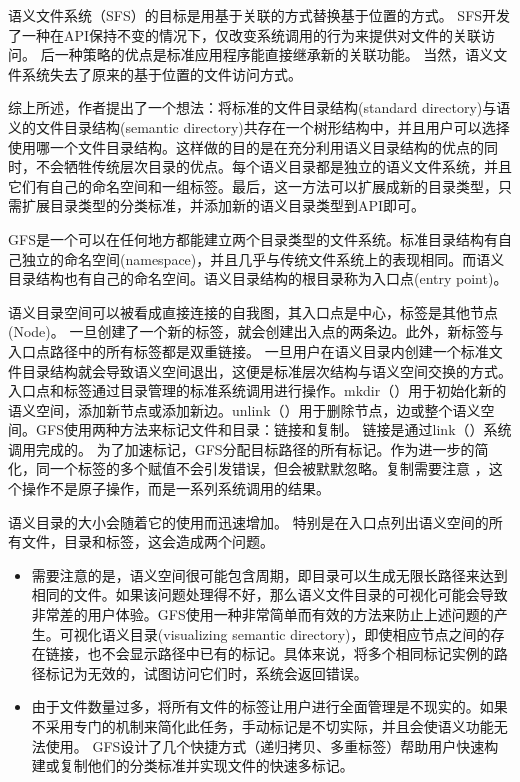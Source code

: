 \documentclass[UTF8]{ctexart}
\begin{document}
语义文件系统（SFS）的目标是用基于关联的方式替换基于位置的方式。 SFS开发了一种在API保持不变的情况下，仅改变系统调用的行为来提供对文件的关联访问。 后一种策略的优点是标准应用程序能直接继承新的关联功能。 当然，语义文件系统失去了原来的基于位置的文件访问方式。

综上所述，作者提出了一个想法：将标准的文件目录结构(standard directory)与语义的文件目录结构(semantic directory)共存在一个树形结构中，并且用户可以选择使用哪一个文件目录结构。这样做的目的是在充分利用语义目录结构的优点的同时，不会牺牲传统层次目录的优点。每个语义目录都是独立的语义文件系统，并且它们有自己的命名空间和一组标签。最后，这一方法可以扩展成新的目录类型，只需扩展目录类型的分类标准，并添加新的语义目录类型到API即可。

GFS是一个可以在任何地方都能建立两个目录类型的文件系统。标准目录结构有自己独立的命名空间(namespace)，并且几乎与传统文件系统上的表现相同。而语义目录结构也有自己的命名空间。语义目录结构的根目录称为入口点(entry point)。

语义目录空间可以被看成直接连接的自我图，其入口点是中心，标签是其他节点(Node)。 一旦创建了一个新的标签，就会创建出入点的两条边。此外，新标签与入口点路径中的所有标签都是双重链接。 一旦用户在语义目录内创建一个标准文件目录结构就会导致语义空间退出，这便是标准层次结构与语义空间交换的方式。入口点和标签通过目录管理的标准系统调用进行操作。mkdir（）用于初始化新的语义空间，添加新节点或添加新边。unlink（）用于删除节点，边或整个语义空间。GFS使用两种方法来标记文件和目录：链接和复制。 链接是通过link（）系统调用完成的。 为了加速标记，GFS分配目标路径的所有标记。作为进一步的简化，同一个标签的多个赋值不会引发错误，但会被默默忽略。复制需要注意 ，这个操作不是原子操作，而是一系列系统调用的结果。

语义目录的大小会随着它的使用而迅速增加。 特别是在入口点列出语义空间的所有文件，目录和标签，这会造成两个问题。
\begin{itemize}
  \item 需要注意的是，语义空间很可能包含周期，即目录可以生成无限长路径来达到相同的文件。如果该问题处理得不好，那么语义文件目录的可视化可能会导致非常差的用户体验。GFS使用一种非常简单而有效的方法来防止上述问题的产生。可视化语义目录(visualizing semantic directory)，即使相应节点之间的存在链接，也不会显示路径中已有的标记。具体来说，将多个相同标记实例的路径标记为无效的，试图访问它们时，系统会返回错误。
  \item 由于文件数量过多，将所有文件的标签让用户进行全面管理是不现实的。如果不采用专门的机制来简化此任务，手动标记是不切实际，并且会使语义功能无法使用。 GFS设计了几个快捷方式（递归拷贝、多重标签）帮助用户快速构建或复制他们的分类标准并实现文件的快速多标记。
\end{itemize}
\end{document}
